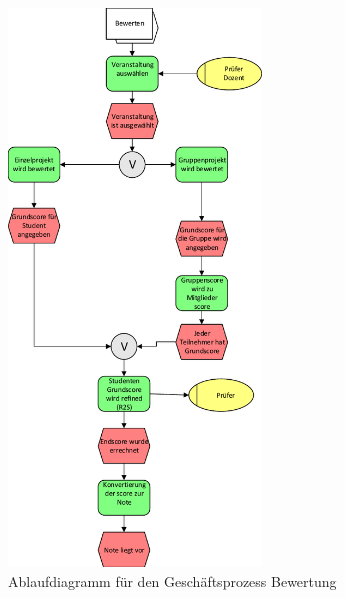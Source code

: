 	\begin{figure}[th!]
	\centering
	\includegraphics[width=0.6\textwidth]{./img/ablauf_2}
	\caption{Ablaufdiagramm für den Geschäftsprozess Bewertung}
	\label{fig:process2}
	\end{figure}

